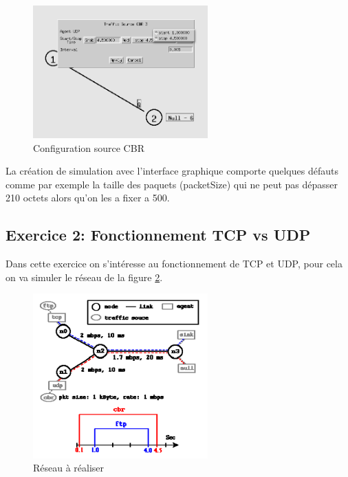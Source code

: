 \documentclass[11pt]{article}
\begin{document}
\begin{figure}[H]
	\begin{center}
		\includegraphics[width=0.6\textwidth]{assets/tp1/modifCBR.png}
	\end{center}
	\caption{Configuration source CBR}
	\label{modifCBR}
\end{figure}

La création de simulation avec l'interface graphique comporte quelques défauts comme par exemple la taille des paquets (packetSize) qui ne peut pas dépasser 210 octets alors qu'on les a fixer a 500.

\subsection{Exercice 2: Fonctionnement TCP vs UDP}

Dans cette exercice on s’intéresse au fonctionnement de TCP et UDP, pour cela on va simuler le réseau de la figure \ref{resSimu}.

\begin{figure}[H]
	\begin{center}
		\includegraphics[width=0.6\textwidth]{assets/tp1/reseauAFaire.png}
	\end{center}
	\caption{Réseau à réaliser}
	\label{resSimu}
\end{figure}
\end{document}

